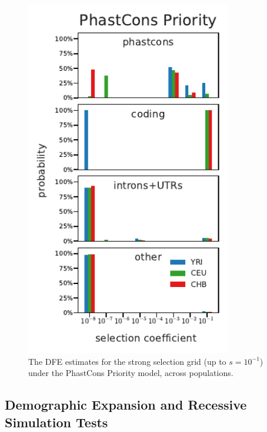 \documentclass[11pt]{article}
\begin{document}
\begin{figure}[htbp]
  \centering
  \includegraphics[width=0.8\textwidth]{figures/supplementary/phastcons_priority_pop_dfe_strongselgrid.pdf}

  \caption{The DFE estimates for the strong selection grid (up to $s=10^{-1}$)
  under the PhastCons Priority model, across populations.}
    \label{suppfig:strong-sel-dfe-pop-feature}
\end{figure}

\subsection{Demographic Expansion and Recessive Simulation Tests}
\label{supp:sim-assum}
\end{document}
